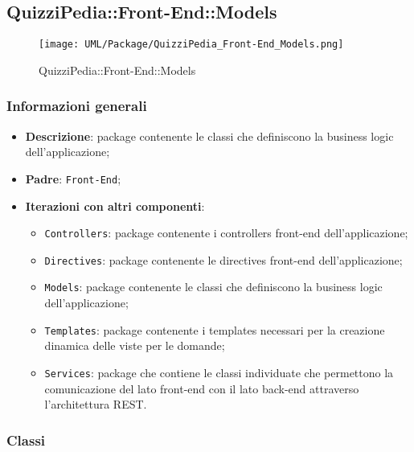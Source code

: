 \newpage

\subsection{QuizziPedia::Front-End::Models}

	\label{QuizziPedia::Front-End::Models}
	
	\begin{figure}[ht]
		\centering
		\texttt{[image: UML/Package/QuizziPedia\_Front-End\_Models.png]}
		\caption{QuizziPedia::Front-End::Models}
	\end{figure} \FloatBarrier

	\subsubsection{Informazioni generali}
		\begin{itemize}
			\item \textbf{Descrizione}: package contenente le classi che definiscono la business logic dell'applicazione;
			\item \textbf{Padre}: \texttt{Front-End};
			\item \textbf{Iterazioni con altri componenti}: 
				\begin{itemize}				
					\item \texttt{Controllers}: package contenente i controllers front-end dell'applicazione;
					\item \texttt{Directives}: package contenente le directives front-end dell'applicazione;
					\item \texttt{Models}: package contenente le classi che definiscono la business logic dell'applicazione;
					\item \texttt{Templates}: package contenente i templates necessari per la creazione dinamica delle viste per le domande;
					\item \texttt{Services}: package che contiene le classi individuate che permettono la comunicazione del lato front-end con il lato back-end attraverso l'architettura REST.
				\end{itemize}

		\end{itemize}
	
	\subsubsection{Classi}
			
			
		
		
		
		
											